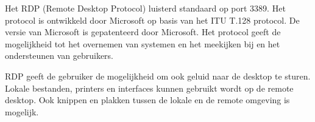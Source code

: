 Het RDP (Remote Desktop Protocol) luisterd standaard op port 3389. Het protocol is ontwikkeld door Microsoft op basis van het ITU T.128 protocol. De versie van Microsoft is gepatenteerd door Microsoft. Het protocol geeft de mogelijkheid tot het overnemen van systemen en het meekijken bij en het ondersteunen van gebruikers.

RDP geeft de gebruiker de mogelijkheid om ook geluid naar de desktop te sturen. Lokale bestanden, printers en interfaces kunnen gebruikt wordt op de remote desktop. Ook knippen en plakken tussen de lokale en de remote omgeving is mogelijk.

